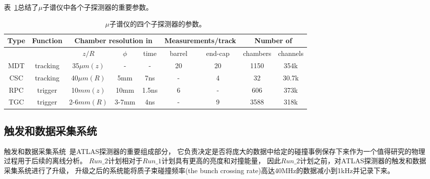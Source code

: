 表~\ref{tab:ATLASTab2}总结了$\mu$子谱仪中各个子探测器的重要参数。


\begin{table}[htbp]
      \caption{
$\mu$子谱仪的四个子探测器的参数。      
      }
      \label{tab:ATLASTab2}
      \centering
      \begin{adjustbox}{width=\columnwidth,center}
      \begin{tabular}{|c|c|c|c|c|c|c|c|c|}
        \hline
         Type & Function  &   \multicolumn{3}{|c|}{Chamber resolution in}   &   \multicolumn{2}{|c|}{Measurements/track}   &   \multicolumn{2}{|c|}{Number of}  \\
         \hline
         &   &  $z/R$ & $\phi$  & time  & barrel  & end-cap  &  chambers &   channels \\
         \hline
         MDT& tracking  & 35$\mu m(z)$ & -  &  - & 20  &  20 & 1150  &  354k \\
         \hline
         CSC& tracking  & 40$\mu m(R)$  &  5mm &  7ns &  - &  4 & 32  & 30.7k  \\
         \hline
         RPC& trigger  &  10$mm(z)$ & 10mm  & 1.5ns  &  6 & -  & 606  &  373k \\
         \hline
         TGC& trigger  & 2-6$mm(R)$  & 3-7mm  & 4ns  &  - & 9  & 3588  &  318k \\
         \hline
      \end{tabular}
      \end{adjustbox}
\end{table}

\subsection{触发和数据采集系统}
\label{sec:ATLASTDAS}

触发和数据采集系统~\cite{ATLASTDAQ}是ATLAS探测器的重要组成部分，
它负责决定是否将庞大的数据中给定的碰撞事例保存下来作为一个值得研究的物理过程用于后续的离线分析。
$Run\_2$计划相对于$Run\_1$计划具有更高的亮度和对撞能量，
因此$Run\_2$计划之前，对ATLAS探测器的触发和数据采集系统进行了升级，
升级之后的系统能将质子束碰撞频率(the bunch crossing rate)高达40MHz的数据减小到1kHz并记录下来。


